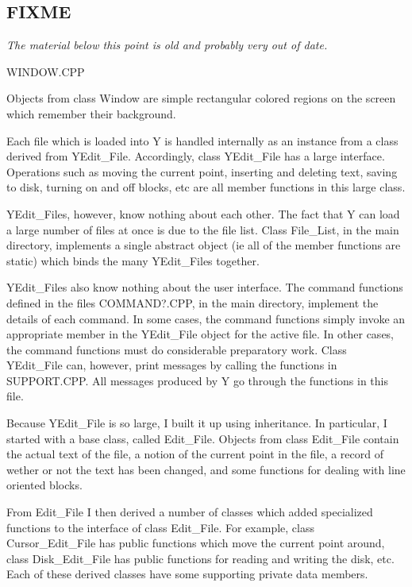 \subsection{FIXME}

\textit{The material below this point is old and probably very out of date.}

WINDOW.CPP

Objects from class Window are simple rectangular colored regions on the screen which remember
their background.

Each file which is loaded into Y is handled internally as an instance from a class derived from
YEdit\_File. Accordingly, class YEdit\_File has a large interface. Operations such as moving the
current point, inserting and deleting text, saving to disk, turning on and off blocks, etc are
all member functions in this large class.

YEdit\_Files, however, know nothing about each other. The fact that Y can load a large number of
files at once is due to the file list. Class File\_List, in the main directory, implements a
single abstract object (ie all of the member functions are static) which binds the many
YEdit\_Files together.

YEdit\_Files also know nothing about the user interface. The command functions defined in the
files COMMAND?.CPP, in the main directory, implement the details of each command. In some cases,
the command functions simply invoke an appropriate member in the YEdit\_File object for the
active file. In other cases, the command functions must do considerable preparatory work. Class
YEdit\_File can, however, print messages by calling the functions in SUPPORT.CPP. All messages
produced by Y go through the functions in this file.

Because YEdit\_File is so large, I built it up using inheritance. In particular, I started with a
base class, called Edit\_File. Objects from class Edit\_File contain the actual text of the file,
a notion of the current point in the file, a record of wether or not the text has been changed,
and some functions for dealing with line oriented blocks.

From Edit\_File I then derived a number of classes which added specialized functions to the
interface of class Edit\_File. For example, class Cursor\_Edit\_File has public functions which
move the current point around, class Disk\_Edit\_File has public functions for reading and writing
the disk, etc. Each of these derived classes have some supporting private data members.

